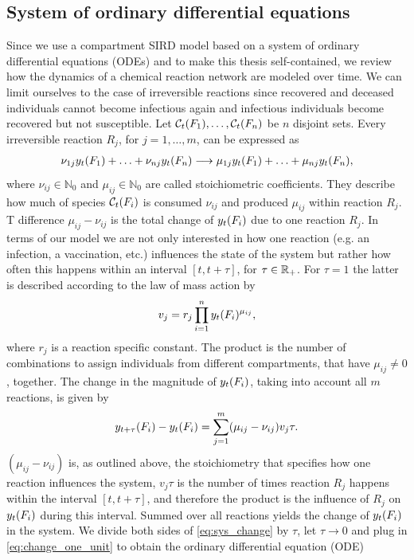 \subsection{System of ordinary differential equations}
Since we use a compartment SIRD model based on a system of ordinary differential equations (ODEs) and to make this thesis self-contained, we review how the dynamics of a chemical reaction network are modeled over time. We can limit ourselves to the case of irreversible reactions since recovered and deceased individuals cannot become infectious again and infectious individuals become recovered but not susceptible. Let $\mathcal{C}_t(F_1), \dots, \mathcal{C}_t(F_n)$ be $n$ disjoint sets. Every irreversible reaction $R_j$, for $j = 1, \dots, m$, can be expressed as
\begin{align}
\nu_{1j} y_t(F_1) + \hdots + \nu_{nj} y_t(F_n) \longrightarrow \mu_{1j} y_t(F_1) + \hdots + \mu_{nj} y_t(F_n),
\end{align}
where $\nu_{ij} \in \mathbb{N}_0$ and $\mu_{ij} \in \mathbb{N}_0$ are called stoichiometric coefficients. They describe how much of species $\mathcal{C}_t(F_i)$ is consumed $\nu_{ij}$ and produced $\mu_{ij}$ within reaction $R_j$. T difference $\mu_{ij} - \nu_{ij}$ is the total change of $y_t(F_i)$ due to one reaction $R_j$. In terms of our model we are not only interested in how one reaction (e.g. an infection, a vaccination, etc.) influences the state of the system but rather how often this happens within an interval $[t, t+\tau]$, for $\tau \in \mathbb{R}_+$. For $\tau = 1$ the latter is described according to the law of mass action by
\begin{align}
\label{eq:change_one_unit}
v_j = r_j  \prod_{i=1}^n y_t(F_i)^{\mu_{ij}},
\end{align}
where $r_j$ is a reaction specific constant. The product is the number of combinations to assign individuals from different compartments, that have $\mu_{ij} \neq 0$, together.
The change in the magnitude of $y_t(F_i)$, taking into account all $m$ reactions, is given by
\begin{align}
\label{eq:sys_change}
y_{t+\tau}(F_i) - y_t(F_i) = \sum_{j=1}^m (\mu_{ij} - \nu_{ij}) v_j \tau.
\end{align}
$(\mu_{ij} - \nu_{ij})$ is, as outlined above, the stoichiometry that specifies how one reaction influences the system, $v_j \tau$ is the number of times reaction $R_j$ happens within the interval $[t, t+\tau]$, and therefore the product is the influence of $R_j$ on $y_t(F_i)$ during this interval. Summed over all reactions yields the change of $y_t(F_i)$ in the system. We divide both sides of \eqref{eq:sys_change} by $\tau$, let $\tau \to 0$ and plug in \eqref{eq:change_one_unit} to obtain the ordinary differential equation (ODE)
